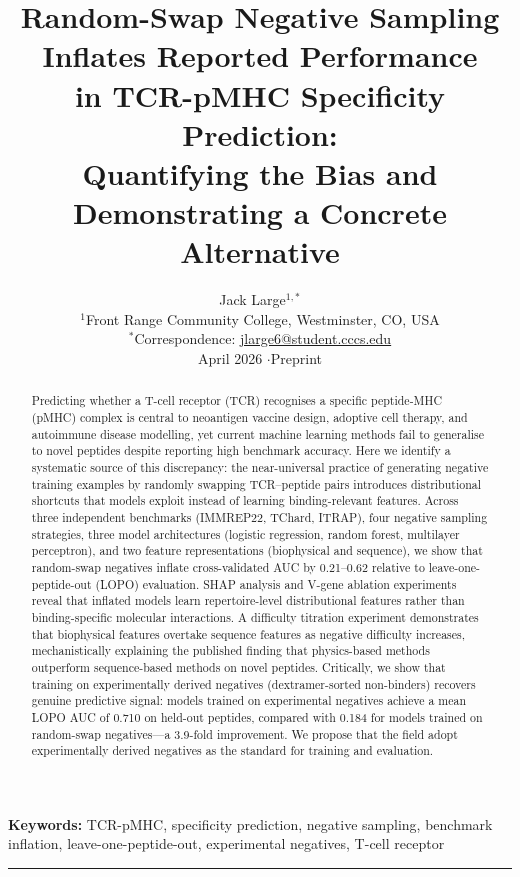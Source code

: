 \documentclass[11pt, a4paper]{article}
\title{\textbf{Random-Swap Negative Sampling Inflates Reported Performance\\in TCR-pMHC Specificity Prediction:\\Quantifying the Bias and Demonstrating a Concrete Alternative}}
\author{Jack Large$^{1,*}$\\[4pt]
\small $^1$Front Range Community College, Westminster, CO, USA\\
\small $^*$Correspondence: \href{mailto:jlarge6@student.cccs.edu}{jlarge6@student.cccs.edu}\\[4pt]
\small April 2026 \quad$\cdot$\quad Preprint}
\date{}
\begin{document}
\maketitle

\begin{abstract}
\noindent Predicting whether a T-cell receptor (TCR) recognises a specific peptide-MHC (pMHC) complex is central to neoantigen vaccine design, adoptive cell therapy, and autoimmune disease modelling, yet current machine learning methods fail to generalise to novel peptides despite reporting high benchmark accuracy. Here we identify a systematic source of this discrepancy: the near-universal practice of generating negative training examples by randomly swapping TCR--peptide pairs introduces distributional shortcuts that models exploit instead of learning binding-relevant features. Across three independent benchmarks (IMMREP22, TChard, ITRAP), four negative sampling strategies, three model architectures (logistic regression, random forest, multilayer perceptron), and two feature representations (biophysical and sequence), we show that random-swap negatives inflate cross-validated AUC by 0.21--0.62 relative to leave-one-peptide-out (LOPO) evaluation. SHAP analysis and V-gene ablation experiments reveal that inflated models learn repertoire-level distributional features rather than binding-specific molecular interactions. A difficulty titration experiment demonstrates that biophysical features overtake sequence features as negative difficulty increases, mechanistically explaining the published finding that physics-based methods outperform sequence-based methods on novel peptides. Critically, we show that training on experimentally derived negatives (dextramer-sorted non-binders) recovers genuine predictive signal: models trained on experimental negatives achieve a mean LOPO AUC of 0.710 on held-out peptides, compared with 0.184 for models trained on random-swap negatives---a 3.9-fold improvement. We propose that the field adopt experimentally derived negatives as the standard for training and evaluation.
\end{abstract}

\textbf{Keywords:} TCR-pMHC, specificity prediction, negative sampling, benchmark inflation, leave-one-peptide-out, experimental negatives, T-cell receptor

\vspace{1em}\hrule\vspace{1em}

\end{document}
